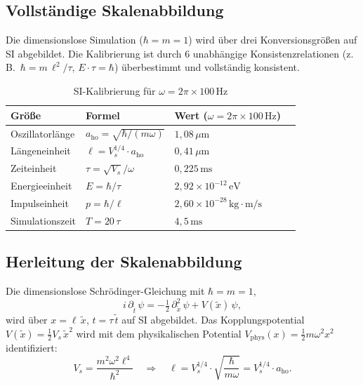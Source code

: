 \documentclass[a4paper,11pt]{article}
\begin{document}
\subsection{Vollständige Skalenabbildung}

Die dimensionslose Simulation ($\hbar = m = 1$) wird über drei
Konversionsgrößen auf SI abgebildet. Die Kalibrierung ist durch
6 unabhängige Konsistenzrelationen (z.\,B.\ $\hbar = m\,\ell^2/\tau$,
$E \cdot \tau = \hbar$) überbestimmt und vollständig konsistent.

\begin{table}[h]
\centering
\caption{SI-Kalibrierung für $\omega = 2\pi \times 100\,\mathrm{Hz}$}
\begin{tabular}{llll}
\toprule
Größe & Formel & Wert ($\omega = 2\pi \times 100\,\mathrm{Hz}$) \\
\midrule
Oszillatorlänge & $a_{\mathrm{ho}} = \sqrt{\hbar/(m\omega)}$ & $1{,}08\,\mu\mathrm{m}$ \\
Längeneinheit & $\ell = V_s^{1/4} \cdot a_{\mathrm{ho}}$ & $0{,}41\,\mu\mathrm{m}$ \\
Zeiteinheit & $\tau = \sqrt{V_s}/\omega$ & $0{,}225\,\mathrm{ms}$ \\
Energieeinheit & $E = \hbar/\tau$ & $2{,}92 \times 10^{-12}\,\mathrm{eV}$ \\
Impulseinheit & $p = \hbar/\ell$ & $2{,}60 \times 10^{-28}\,\mathrm{kg\cdot m/s}$ \\
Simulationszeit & $T = 20\,\tau$ & $4{,}5\,\mathrm{ms}$ \\
\bottomrule
\end{tabular}
\end{table}

\subsection{Herleitung der Skalenabbildung}

Die dimensionslose Schrödinger-Gleichung mit $\hbar = m = 1$,
\[
  i\,\partial_{\tilde{t}}\,\psi = -\tfrac{1}{2}\,\partial_{\tilde{x}}^2\,\psi
  + V(\tilde{x})\,\psi,
\]
wird über $x = \ell\,\tilde{x}$, $t = \tau\,\tilde{t}$ auf SI abgebildet.
Das Kopplungspotential $V(\tilde{x}) = \tfrac{1}{2}V_s\,\tilde{x}^2$
wird mit dem physikalischen Potential $V_{\mathrm{phys}}(x) = \tfrac{1}{2}m\omega^2 x^2$
identifiziert:
\[
  V_s = \frac{m^2\omega^2\ell^4}{\hbar^2}
  \quad\Longrightarrow\quad
  \ell = V_s^{1/4} \cdot \sqrt{\frac{\hbar}{m\omega}} = V_s^{1/4} \cdot a_{\mathrm{ho}}.
\]
\end{document}
